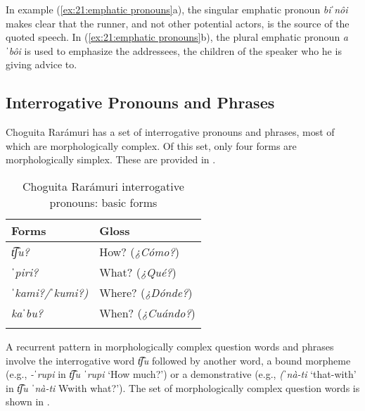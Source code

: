 In example (\ref{ex:21:emphatic pronouns}a), the singular emphatic pronoun \textit{biˈnôi} makes clear that the runner, and not other potential actors, is the source of the quoted speech. In (\ref{ex:21:emphatic pronouns}b), the  plural emphatic pronoun \textit{aˈbôi} is used to emphasize the addressees, the children of the speaker who he is giving advice to.

\subsection{Interrogative Pronouns and Phrases}
\label{subsec:21:interrogative pronouns}


Choguita Rarámuri has a set of interrogative pronouns and phrases, most of which are morphologically complex.  Of this set, only four forms are morphologically simplex. These are provided in .


\begin{table}
\begin{tabularx}{.5\textwidth}{ll}
\lsptoprule
\textbf{Forms}  & \textbf{Gloss} \\
\midrule
\textit{t͡ʃu?} & How? (\textit{¿Cómo?})\\
\textit{ˈpiri?}  & What? (\textit{¿Qué?})\\
\textit{ˈkami?/ˈkumi?)}  & Where? (\textit{¿Dónde?})\\
\textit{kaˈbu?} & When? (\textit{¿Cuándo?})\\
\lspbottomrule
\end{tabularx}
\caption{Choguita Rarámuri interrogative pronouns: basic forms}
\label{tab:21:1}
\end{table}

A recurrent pattern in morphologically complex question words and phrases involve the interrogative word \textit{t͡ʃu} followed by another word, a bound morpheme (e.g., \textit{-ˈrupi} in \textit{t͡ʃu ˈrupi} `How much?') or a demonstrative (e.g., \textit{(ˈnà-ti} `that-with' in \textit{t͡ʃu ˈnà-ti} Wwith what?'). The set of morphologically complex question words is shown in .


